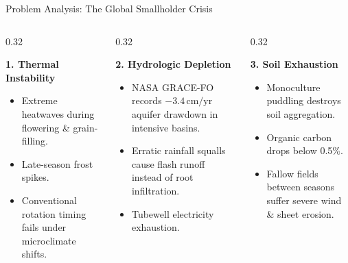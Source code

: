 \documentclass[aspectratio=169,10pt]{beamer}
\begin{document}
\begin{frame}{Problem Analysis: The Global Smallholder Crisis}
    \begin{columns}[T]
        \begin{column}{0.32\textwidth}
            \begin{alertblock}{\textbf{1. Thermal Instability}}
                \footnotesize
                \begin{itemize}
                    \item Extreme heatwaves during flowering \& grain-filling.
                    \item Late-season frost spikes.
                    \item Conventional rotation timing fails under microclimate shifts.
                \end{itemize}
            \end{alertblock}
        \end{column}
        \begin{column}{0.32\textwidth}
            \begin{alertblock}{\textbf{2. Hydrologic Depletion}}
                \footnotesize
                \begin{itemize}
                    \item NASA GRACE-FO records \textbf{$-3.4\,\text{cm/yr}$} aquifer drawdown in intensive basins.
                    \item Erratic rainfall squalls cause flash runoff instead of root infiltration.
                    \item Tubewell electricity exhaustion.
                \end{itemize}
            \end{alertblock}
        \end{column}
        \begin{column}{0.32\textwidth}
            \begin{alertblock}{\textbf{3. Soil Exhaustion}}
                \footnotesize
                \begin{itemize}
                    \item Monoculture puddling destroys soil aggregation.
                    \item Organic carbon drops below 0.5\%.
                    \item Fallow fields between seasons suffer severe wind \& sheet erosion.

\end{itemize}
\end{alertblock}
\end{column}
\end{columns}
\end{frame}
\end{document}
